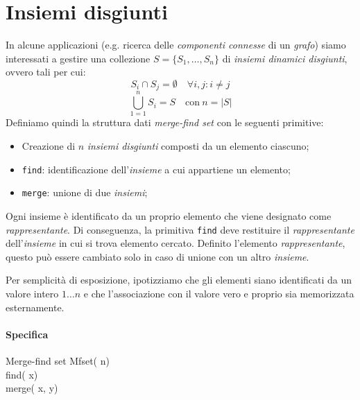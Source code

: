 \section{Insiemi disgiunti}
In alcune applicazioni (e.g. ricerca delle \emph{componenti connesse} di un
\emph{grafo}) siamo interessati a gestire una collezione $S=\{S_1,\dots,
S_n\}$ di \emph{insiemi dinamici disgiunti}, ovvero tali per cui:
\[S_i\cap S_j=\emptyset\quad\forall i,j : i\neq j\]
\[\bigcup_{1=1}^n S_i=S\quad\text{con}\ n=\left|S\right|\]
Definiamo quindi la struttura dati \emph{merge-find set} con le seguenti primitive:
\begin{itemize}
    \item Creazione di $n$ \emph{insiemi disgiunti} composti da un elemento
    ciascuno;
    \item \texttt{find}: identificazione dell'\emph{insieme} a cui appartiene un
    elemento;
    \item \texttt{merge}: unione di due \emph{insiemi};
\end{itemize}\noindent
Ogni insieme è identificato da un proprio elemento che viene designato come
\emph{rappresentante}. Di conseguenza, la primitiva \texttt{find} deve restituire
il \emph{rappresentante} dell'\emph{insieme} in cui si trova elemento cercato.
Definito l'elemento \emph{rappresentante}, questo può essere cambiato solo in
caso di unione con un altro \emph{insieme}.

\begin{note}
    Per semplicità di esposizione, ipotizziamo che gli elementi siano identificati
    da un valore intero $1\dots n$ e che l'associazione con il valore vero e
    proprio sia memorizzata esternamente.
\end{note}

\paragraph{Specifica}
\begin{code}{Merge-find set}
     Mfset( n)\\
     find( x)\\
    merge( x,  y)
\end{code}

